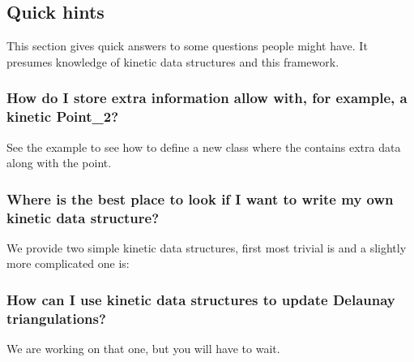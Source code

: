 \subsection{Quick hints \label{sec:quick_hints}}

This section gives quick answers to some questions people might have.
It presumes knowledge of kinetic data structures and this framework.

\subsubsection{How do I store extra information allow with, for example, a kinetic Point\_2?}

See the example
 to see how
to define a new  class where the
 contains extra data along with the point.

\subsubsection{Where is the best place to look if I want to write my own kinetic data structure?}
We provide two simple kinetic data structures, first most trivial is
 and a slightly more
complicated one is:


\subsubsection{How can I use kinetic data structures to update Delaunay triangulations?}
We are working on that one, but you will have to wait.



